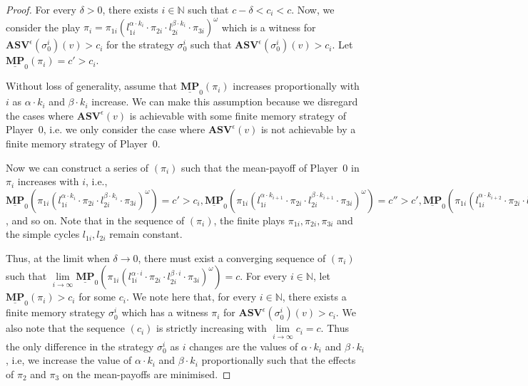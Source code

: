 \begin{proof}
    For every $\delta > 0$, there exists $i \in \mathbb{N}$ such that $c - \delta < c_i < c$. Now, we consider the play $\pi_i = \pi_{1i}(l^{\alpha \cdot k_i}_{1i} \cdot \pi_{2i} \cdot l^{\beta \cdot k_i}_{2i} \cdot \pi_{3i})^{\omega}$ which is a witness for $ \mathbf{ASV}^{\epsilon}(\sigma_0^i)(v) > c_i$ for the strategy $\sigma_0^i$ such that $\mathbf{ASV}^{\epsilon} (\sigma_0^i)(v) > c_i$. Let $\underline{\mathbf{MP}}_0(\pi_i)= c' > c_i$. 

    Without loss of generality, assume that $\underline{\mathbf{MP}}_0(\pi_i)$ increases proportionally with $i$ as $\alpha \cdot k_i$ and $\beta \cdot k_i$ increase. We can make this assumption because we disregard the cases where $\mathbf{ASV}^{\epsilon}(v)$ is achievable with some finite memory strategy of Player~0, i.e. we only consider the case where $\mathbf{ASV}^{\epsilon}(v)$ is not achievable by a finite memory strategy of Player~0.

    Now we can construct a series of $(\pi_i)$ such that the  mean-payoff of Player~0 in $\pi_i$ increases with $i$, i.e., $\underline{\mathbf{MP}}_0(\pi_{1i}(l^{\alpha \cdot k_i}_{1i} \cdot \pi_{2i} \cdot l^{\beta \cdot k_i}_{2i} \cdot \pi_{3i})^{\omega}) = c' > c_i, \underline{\mathbf{MP}}_0(\pi_{1i}(l^{\alpha \cdot k_{i+1}}_{1i} \cdot \pi_{2i} \cdot l^{\beta \cdot k_{i+1}}_{2i} \cdot \pi_{3i})^{\omega}) = c'' > c', \underline{\mathbf{MP}}_0(\pi_{1i}(l^{\alpha \cdot k_{i+2}}_{1i} \cdot \pi_{2i} \cdot l^{\beta \cdot k_{i+2}}_{2i} \cdot \pi_{3i})^{\omega}) = c''' > c''$, and so on. Note that in the sequence of $(\pi_i)$, the finite plays $\pi_{1i}, \pi_{2i}, \pi_{3i}$ and the simple cycles $l_{1i}, l_{2i}$ remain constant.

    Thus, at the limit when $\delta \to 0$, there must exist a converging sequence of $(\pi_i)$  such that $\lim \limits_{i \to \infty} \underline{\mathbf{MP}}_0(\pi_{1i}(l^{\alpha \cdot i}_{1i} \cdot \pi_{2i} \cdot l^{\beta \cdot i}_{2i} \cdot \pi_{3i})^{\omega}) = c$. For every $i \in \mathbb{N}$, let $\underline{\mathbf{MP}}_0(\pi_i) > c_i$ for some $c_i$. We note here that, for every $i \in \mathbb{N}$, there exists a finite memory strategy $\sigma_0^i$ which has a witness $\pi_i$ for $ \mathbf{ASV}^{\epsilon}(\sigma_0^i)(v) > c_i$. We also note that the sequence $(c_i)$ is strictly increasing with $\lim \limits_{i \to \infty} c_i = c$. Thus the only difference in the strategy $\sigma_0^i$ as $i$ changes are the values of $\alpha \cdot k_i$ and $\beta \cdot k_i$, i.e, we increase the value of $\alpha \cdot k_i$ and $\beta \cdot k_i$ proportionally such that the effects of $\pi_2$ and $\pi_3$ on the mean-payoffs are minimised. 


\end{proof}
